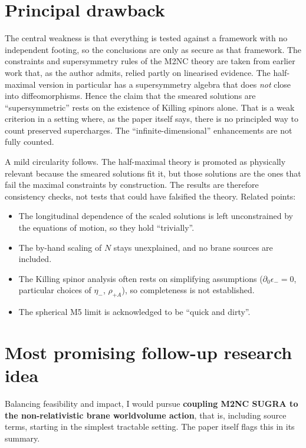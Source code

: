 \documentclass[11pt]{article}
\newcommand{\MNC}{M2NC}
\begin{document}
\section{Principal drawback}
The central weakness is that everything is tested against a framework with no independent footing, so the conclusions are only as secure as that framework.
The constraints and supersymmetry rules of the \MNC{} theory are taken from earlier work that, as the author admits, relied partly on linearised evidence.
The half-maximal version in particular has a supersymmetry algebra that does \emph{not} close into diffeomorphisms.
Hence the claim that the smeared solutions are ``supersymmetric'' rests on the existence of Killing spinors alone.
That is a weak criterion in a setting where, as the paper itself says, there is no principled way to count preserved supercharges.
The ``infinite-dimensional'' enhancements are not fully counted.

A mild circularity follows.
The half-maximal theory is promoted as physically relevant because the smeared solutions fit it, but those solutions are the ones that fail the maximal constraints by construction.
The results are therefore consistency checks, not tests that could have falsified the theory.
Related points:
\begin{itemize}[nosep]
\item The longitudinal dependence of the scaled solutions is left unconstrained by the equations of motion, so they hold ``trivially''.
\item The by-hand scaling of $N$ stays unexplained, and no brane sources are included.
\item The Killing spinor analysis often rests on simplifying assumptions ($\partial_0\epsilon_-=0$, particular choices of $\eta_-$, $\rho_{+A}$), so completeness is not established.
\item The spherical M5 limit is acknowledged to be ``quick and dirty''.
\end{itemize}

\section{Most promising follow-up research idea}
Balancing feasibility and impact, I would pursue \textbf{coupling \MNC{} SUGRA to the non-relativistic brane worldvolume action}, that is, including source terms, starting in the simplest tractable setting.
The paper itself flags this in its summary.
\end{document}
